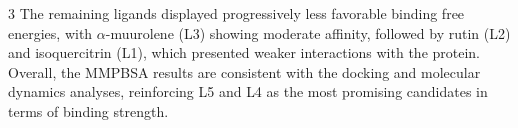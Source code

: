 \documentclass[portrait,final,20pt,ra0]{sciposter}
\begin{document}
\begin{multicols*}{3}
The remaining ligands displayed progressively less favorable binding free energies, with $\alpha$-muurolene (L3) showing moderate affinity, followed by rutin (L2) and isoquercitrin (L1), which presented weaker interactions with the protein. Overall, the MMPBSA results are consistent with the docking and molecular dynamics analyses, reinforcing L5 and L4 as the most promising candidates in terms of binding strength.

\vspace{0.0cm}

    






\end{multicols*}
\end{document}
